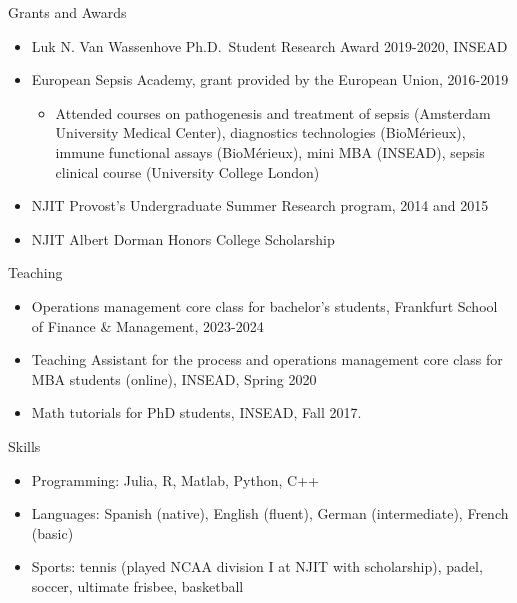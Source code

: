 \documentclass{resume}
\begin{document}
\begin{rSection}{Grants and Awards}

\begin{itemize}
\item Luk N. Van Wassenhove Ph.D.\ Student Research Award 2019-2020, INSEAD
\item European Sepsis Academy, grant provided by the European Union, 2016-2019
\begin{itemize}
  \item Attended courses on pathogenesis and treatment of sepsis (Amsterdam University Medical Center), diagnostics technologies (BioM\'erieux), immune functional assays (BioM\'erieux), mini MBA (INSEAD), sepsis clinical course (University College London)
\end{itemize}
\item NJIT Provost's Undergraduate Summer Research program, 2014 and 2015
\item NJIT Albert Dorman Honors College Scholarship
\end{itemize}

\begin{rSection}{Teaching}
\begin{itemize}
\item Operations management core class for bachelor's students, Frankfurt School of Finance \& Management, 2023-2024
\item Teaching Assistant for the process and operations management core class for MBA students (online), INSEAD, Spring 2020
\item Math tutorials for PhD students, INSEAD, Fall 2017.
\end{itemize}

\end{rSection}


\end{rSection}

\begin{rSection}{Skills}
\begin{itemize}
\item Programming: Julia, R, Matlab, Python, C++
\item Languages: Spanish (native), English (fluent), German (intermediate), French (basic)
\item Sports: tennis (played NCAA division I at NJIT with scholarship), padel, soccer, ultimate frisbee, basketball
\end{itemize}

\end{rSection}
\end{document}
